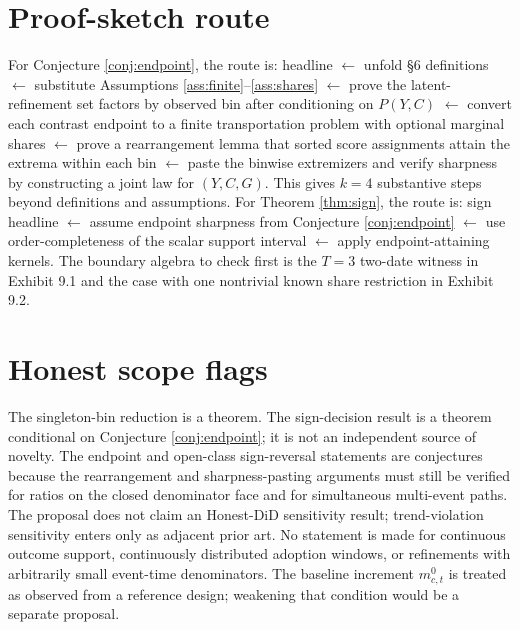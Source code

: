\documentclass[11pt]{article}
\theoremstyle{definition}
\theoremstyle{plain}
\theoremstyle{remark}
\begin{document}
\section{Proof-sketch route}
For Conjecture \ref{conj:endpoint}, the route is: headline \(\leftarrow\) unfold \S6 definitions \(\leftarrow\) substitute Assumptions \ref{ass:finite}--\ref{ass:shares} \(\leftarrow\) prove the latent-refinement set factors by observed bin after conditioning on \(P(Y,C)\) \(\leftarrow\) convert each contrast endpoint to a finite transportation problem with optional marginal shares \(\leftarrow\) prove a rearrangement lemma that sorted score assignments attain the extrema within each bin \(\leftarrow\) paste the binwise extremizers and verify sharpness by constructing a joint law for \((Y,C,G)\). This gives \(k=4\) substantive steps beyond definitions and assumptions. For Theorem \ref{thm:sign}, the route is: sign headline \(\leftarrow\) assume endpoint sharpness from Conjecture \ref{conj:endpoint} \(\leftarrow\) use order-completeness of the scalar support interval \(\leftarrow\) apply endpoint-attaining kernels. The boundary algebra to check first is the \(T=3\) two-date witness in Exhibit 9.1 and the case with one nontrivial known share restriction in Exhibit 9.2.

\section{Honest scope flags}
The singleton-bin reduction is a theorem. The sign-decision result is a theorem conditional on Conjecture \ref{conj:endpoint}; it is not an independent source of novelty. The endpoint and open-class sign-reversal statements are conjectures because the rearrangement and sharpness-pasting arguments must still be verified for ratios on the closed denominator face and for simultaneous multi-event paths. The proposal does not claim an Honest-DiD sensitivity result; trend-violation sensitivity enters only as adjacent prior art. No statement is made for continuous outcome support, continuously distributed adoption windows, or refinements with arbitrarily small event-time denominators. The baseline increment \(m^0_{c,t}\) is treated as observed from a reference design; weakening that condition would be a separate proposal.
\end{document}
